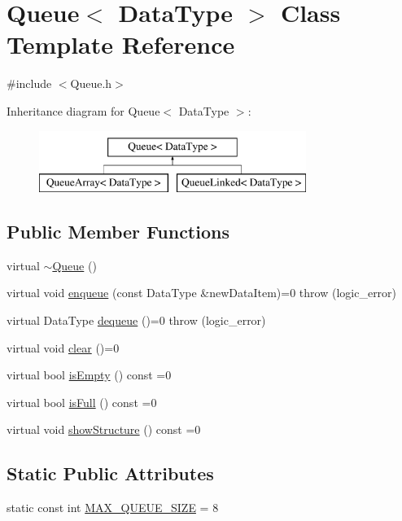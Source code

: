 \hypertarget{class_queue}{\section{\-Queue$<$ \-Data\-Type $>$ \-Class \-Template \-Reference}
\label{class_queue}
}


{\ttfamily \#include $<$\-Queue.\-h$>$}

\-Inheritance diagram for \-Queue$<$ \-Data\-Type $>$\-:\begin{figure}[H]
\begin{center}
\leavevmode
\includegraphics[height=2.000000cm]{class_queue}
\end{center}
\end{figure}
\subsection*{\-Public \-Member \-Functions}
\begin{DoxyCompactItemize}
\item 
virtual \hyperlink{class_queue_a57485f879466a4af623ee1a61424ad33}{$\sim$\-Queue} ()
\item 
virtual void \hyperlink{class_queue_a4e0052bab8c2fb742a16a77d73ec3d5a}{enqueue} (const \-Data\-Type \&new\-Data\-Item)=0  throw (logic\-\_\-error)
\item 
virtual \-Data\-Type \hyperlink{class_queue_afde1535196f515caba0aa5cfbe62d329}{dequeue} ()=0  throw (logic\-\_\-error)
\item 
virtual void \hyperlink{class_queue_afba4d82c9a20859bb6397bd73c230cdd}{clear} ()=0
\item 
virtual bool \hyperlink{class_queue_a1b8e1c0b8bb621de8d4f20c011176bd2}{is\-Empty} () const =0
\item 
virtual bool \hyperlink{class_queue_ae64751e270709a705d49e6168e64ade8}{is\-Full} () const =0
\item 
virtual void \hyperlink{class_queue_a7db7279a763ca59f7fef354759beab17}{show\-Structure} () const =0
\end{DoxyCompactItemize}
\subsection*{\-Static \-Public \-Attributes}
\begin{DoxyCompactItemize}
\item 
static const int \hyperlink{class_queue_aaf3eed0540baaf6609b48910aacc7133}{\-M\-A\-X\-\_\-\-Q\-U\-E\-U\-E\-\_\-\-S\-I\-Z\-E} = 8
\end{DoxyCompactItemize}
